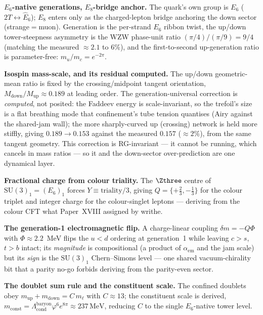 \documentclass[11pt,a4paper]{article}
\newcommand{\vp}{\varphi}
\newcommand{\aem}{\alpha_{\mathrm{em}}}
\begin{document}
\textbf{$E_6$-native generations, $E_8$-bridge anchor.}
The quark's own group is $E_6$ ($2T\leftrightarrow\hat{E}_6$); $E_8$ enters only
as the charged-lepton bridge anchoring the down sector (strange$=$muon).
Generation is the per-strand $E_6$ ribbon twist, the up/down tower-steepness
asymmetry is the WZW phase-unit ratio $(\pi/4)/(\pi/9)=9/4$ (matching the
measured $\approx2.1$ to $6\%$), and the first-to-second up-generation ratio is
parameter-free: $m_u/m_c=e^{-2\pi}$.

\textbf{Isospin mass-scale, and its residual computed.}
The up/down geometric-mean ratio is fixed by the crossing/midpoint tangent
orientation, $M_{\mathrm{down}}/M_{\mathrm{up}}\approx0.189$ at leading order.
The generation-universal correction is \emph{computed}, not posited: the Faddeev
energy is scale-invariant, so the trefoil's size is a flat breathing mode that
confinement's tube tension quantises (Airy against the shared-jam wall); the
more sharply-curved up (crossing) network is held more stiffly, giving
$0.189\to0.153$ against the measured $0.157$ ($\approx2\%$), from the same
tangent geometry. This correction is RG-invariant --- it cannot be running,
which cancels in mass ratios --- so it and the down-sector over-prediction are
one dynamical layer.

\textbf{Fractional charge from colour triality.}
The $\Zthree$ centre of $\mathrm{SU}(3)_1=(E_6)_1$ forces
$Y\equiv\mathrm{triality}/3$, giving $Q=\{+\tfrac23,-\tfrac13\}$ for the colour
triplet and integer charge for the colour-singlet leptons --- deriving from the
colour CFT what Paper~XVIII assigned by writhe.

\textbf{The generation-1 electromagnetic flip.}
A charge-linear coupling $\delta m=-Q\Phi$ with $\Phi\approx2.2$~MeV flips the
$u<d$ ordering at generation~1 while leaving $c>s$, $t>b$ intact; its
\emph{magnitude} is compositional (a product of $\aem$ and the jam scale) but
its \emph{sign} is the $\mathrm{SU}(3)_1$ Chern--Simons level --- one shared
vacuum-chirality bit that a parity no-go forbids deriving from the parity-even
sector.

\textbf{The doublet sum rule and the constituent scale.}
The confined doublets obey $m_{\mathrm{up}}+m_{\mathrm{down}}=C\,m_\ell$ with
$C\approx13$; the constituent scale is derived,
$m_{\mathrm{const}}=\Lambda_{\mathrm{cond}}^{\mathrm{baryon}}\vp^6 e^{8\pi}
\approx237\,\mathrm{MeV}$, reducing $C$ to the single $E_6$-native tower level.
\end{document}

